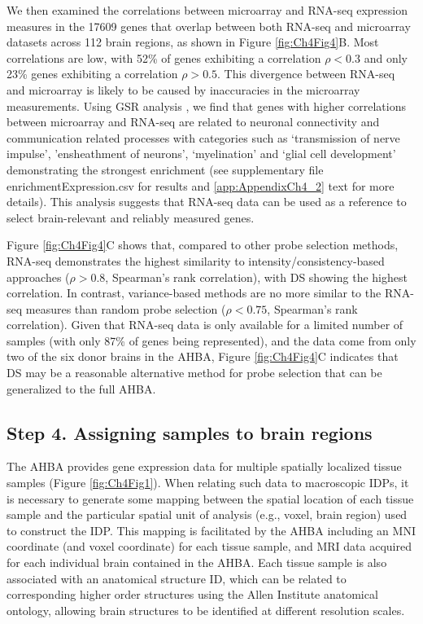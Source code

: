 We then examined the correlations between microarray and RNA-seq expression measures in the \num{17609} genes that overlap between both RNA-seq and microarray datasets across 112 brain regions, as shown in Figure \ref{fig:Ch4Fig4}B. Most correlations are low, with 52\% of genes exhibiting a correlation $\rho < 0.3$ and only 23\% genes exhibiting a correlation $\rho > 0.5$. This divergence between RNA-seq and microarray is likely to be caused by inaccuracies in the microarray measurements. Using GSR analysis \citep{Gillis2010}, we find that genes with higher correlations between microarray and RNA-seq are related to neuronal connectivity and communication related processes with categories such as ‘transmission of nerve impulse’, ’ensheathment of neurons’, ‘myelination’ and ‘glial cell development’ demonstrating the strongest enrichment (see supplementary file enrichmentExpression.csv for results and \ref{app:AppendixCh4_2} text for more details). This analysis suggests that RNA-seq data can be used as a reference to select brain-relevant and reliably measured genes.

Figure \ref{fig:Ch4Fig4}C shows that, compared to other probe selection methods, RNA-seq demonstrates the highest similarity to intensity/consistency-based approaches ($\rho > 0.8$, Spearman's rank correlation), with DS showing the highest correlation. In contrast, variance-based methods are no more similar to the RNA-seq measures than random probe selection ($\rho < 0.75$, Spearman's rank correlation). Given that RNA-seq data is only available for a limited number of samples (with only 87\% of genes being represented), and the data come from only two of the six donor brains in the AHBA, Figure \ref{fig:Ch4Fig4}C indicates that DS may be a reasonable alternative method for probe selection that can be generalized to the full AHBA.

\subsection{Step 4. Assigning samples to brain regions}

The AHBA provides gene expression data for multiple spatially localized tissue samples (Figure \ref{fig:Ch4Fig1}). When relating such data to macroscopic IDPs, it is necessary to generate some mapping between the spatial location of each tissue sample and the particular spatial unit of analysis (e.g., voxel, brain region) used to construct the IDP. This mapping is facilitated by the AHBA including an MNI coordinate (and voxel coordinate) for each tissue sample, and MRI data acquired for each individual brain contained in the AHBA. Each tissue sample is also associated with an anatomical structure ID, which can be related to corresponding higher order structures using the Allen Institute anatomical ontology, allowing brain structures to be identified at different resolution scales.

